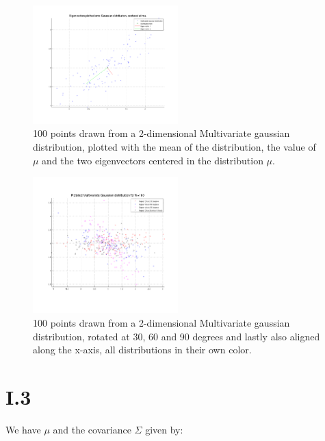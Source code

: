 \begin{figure}[h!]
	\includegraphics[width=0.5\textwidth]{img/multigausseigen}
	\caption{100 points drawn from a 2-dimensional Multivariate gaussian distribution, plotted with the
	mean of the distribution, the value of $\mu$ and the two eigenvectors centered in the distribution $\mu$. \label{fig:I.2.4.1}}
\end{figure}

\begin{figure}[h!]
	\includegraphics[width=0.5\textwidth]{img/multigaussrotate}
	\caption{100 points drawn from a 2-dimensional Multivariate gaussian distribution, rotated at 30, 60 and 90 degrees
	and lastly also aligned along the x-axis, all distributions in their own color. \label{fig:I.2.4.1.rot}}
\end{figure}

\section*{I.3}
We have $\mu$ and the covariance $\Sigma$ given by:
\begin{align}

\end{align}
